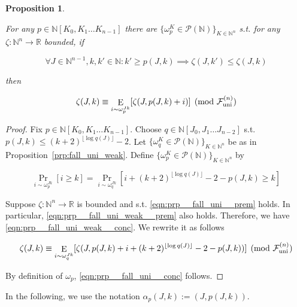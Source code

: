 \documentclass{article}
\numberwithin{equation}{section}
\theoremstyle{definition}
\theoremstyle{plain}
\newtheorem{proposition}{Proposition}[section]
\DeclareMathOperator{\Prb}{Pr}
\DeclareMathOperator{\E}{E}
\newcommand{\Nats}{\mathbb{N}}
\newcommand{\Reals}{\mathbb{R}}
\newcommand{\NatPoly}{\Nats[K_0, K_1 \ldots K_{n-1}]}
\newcommand{\NatPolyJ}{\Nats[J_0, J_1 \ldots J_{n-2}]}
\newcommand{\NatFun}{\Nats^n \rightarrow}
\newcommand{\Floor}[1]{\lfloor #1 \rfloor}
\newcommand{\Fall}{\mathcal{F}}
\newcommand{\FallU}{{\Fall_{\textnormal{uni}}^{(n)}}}
\begin{document}
\begin{samepage}
\begin{proposition}
\label{prp:fall_uni}

For any ${p \in \NatPoly}$ there are ${\{\omega_p^K \in \mathcal{P}(\Nats)\}_{K \in \Nats^n}}$ s.t. for any ${\zeta: \NatFun \Reals}$ bounded, if 

\begin{equation}
\label{eqn:prp__fall_uni__prem}
\forall J \in \Nats^{n-1}, k,k' \in \Nats: k' \geq p(J,k) \implies \zeta(J,k') \leq \zeta(J,k)
\end{equation}

then

\begin{equation}
\label{eqn:prp__fall_uni__conc}
\zeta(J,k) \equiv \E_{i \sim \omega_p^{Jk}}[\zeta(J,p(J,k)+i)] \pmod \FallU
\end{equation}

\end{proposition}
\end{samepage}

\begin{proof}

Fix ${p \in \NatPoly}$. Choose ${q \in \NatPolyJ}$ s.t. ${p(J,k) \leq (k+2)^{\Floor{\log q(J)}}}-2$. Let ${\{\omega_q^K \in \mathcal{P}(\Nats)\}_{K \in \Nats^n}}$ be as in Proposition~\ref{prp:fall_uni_weak}. Define ${\{\omega_p^K \in \mathcal{P}(\Nats)\}_{K \in \Nats^n}}$ by

\[\Prb_{i \sim \omega_p^{Jk}}[i \geq k] = \Prb_{i \sim \omega_q^{Jk}}[i + (k+2)^{\Floor{\log q(J)}} - 2 - p(J,k) \geq k]\]

Suppose ${\zeta: \NatFun \Reals}$ is bounded and s.t. \ref{eqn:prp__fall_uni__prem} holds. In particular, \ref{eqn:prp__fall_uni_weak__prem} also holds. Therefore, we have \ref{eqn:prp__fall_uni_weak__conc}. We rewrite it as follows

\[\zeta(J,k) \equiv \E_{i \sim \omega_q^{Jk}}[\zeta(J, p(J,k) + i+ (k+2)^{\Floor{\log q(J)}} - 2 - p(J,k))] \pmod \FallU\]

By definition of ${\omega_p}$, \ref{eqn:prp__fall_uni__conc} follows.
%
\end{proof}

In the following, we use the notation ${\alpha_{p}(J,k):=(J,p(J,k))}$.
\end{document}
